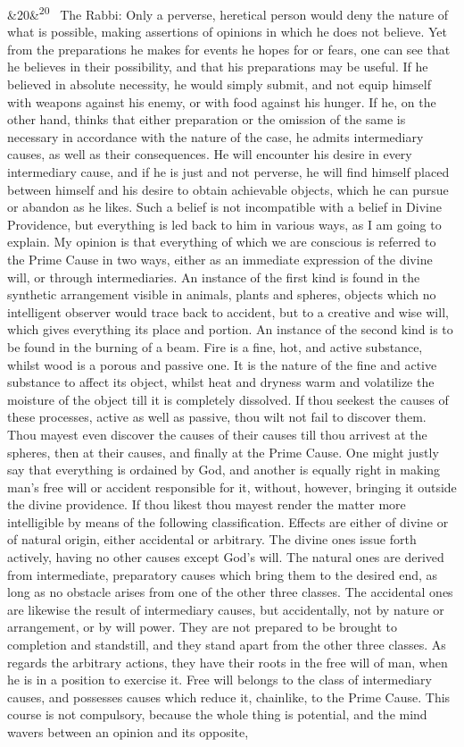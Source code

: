 \documentclass[12pt]{article}
\newcommand{\para}[1][]{\par\noindent\ifx&#1&\else\textsuperscript{\footnotesize #1}~\fi}
\begin{document}
\para[20] The Rabbi: Only a perverse, heretical person would deny the nature of what is possible, making assertions of opinions in which he does not believe. Yet from the preparations he makes for events he hopes for or fears, one can see that he believes in their possibility, and that his preparations may be useful. If he believed in absolute necessity, he would simply submit, and not equip himself with weapons against his enemy, or with food against his hunger. If he, on the other hand, thinks that either preparation or the omission of the same is necessary in accordance with the nature of the case, he admits intermediary causes, as well as their consequences. He will encounter his desire in every intermediary cause, and if he is just and not perverse, he will find himself placed between himself and his desire to obtain achievable objects, which he can pursue or abandon as he likes. Such a belief is not incompatible with a belief in Divine Providence, but everything is led back to him in various ways, as I am going to explain. My opinion is that everything of which we are conscious is referred to the Prime Cause in two ways, either as an immediate expression of the divine will, or through intermediaries. An instance of the first kind is found in the synthetic arrangement visible in animals, plants and spheres, objects which no intelligent observer would trace back to accident, but to a creative and wise will, which gives everything its place and portion. An instance of the second kind is to be found in the burning of a beam. Fire is a fine, hot, and active substance, whilst wood is a porous and passive one. It is the nature of the fine and active substance to affect its object, whilst heat and dryness warm and volatilize the moisture of the object till it is completely dissolved. If thou seekest the causes of these processes, active as well as passive, thou wilt not fail to discover them. Thou mayest even discover the causes of their causes till thou arrivest at the spheres, then at their causes, and finally at the Prime Cause. One might justly say that everything is ordained by God, and another is equally right in making man's free will or accident responsible for it, without, however, bringing it outside the divine providence. If thou likest thou mayest render the matter more intelligible by means of the following classification. Effects are either of divine or of natural origin, either accidental or arbitrary. The divine ones issue forth actively, having no other causes except God's will. The natural ones are derived from intermediate, preparatory causes which bring them to the desired end, as long as no obstacle arises from one of the other three classes. The accidental ones are likewise the result of intermediary causes, but accidentally, not by nature or arrangement, or by will power. They are not prepared to be brought to completion and standstill, and they stand apart from the other three classes. As regards the arbitrary actions, they have their roots in the free will of man, when he is in a position to exercise it. Free will belongs to the class of intermediary causes, and possesses causes which reduce it, chainlike, to the Prime Cause. This course is not compulsory, because the whole thing is potential, and the mind wavers between an opinion and its opposite, 
\end{document}
